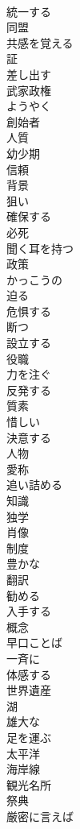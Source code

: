 \documentclass[8pt]{extreport}
\begin{document}
\begin{CJK}{UTF8}{min}
\\	統一する
\\	同盟
\\	共感を覚える
\\	証
\\	差し出す
\\	武家政権
\\	ようやく
\\	創始者
\\	人質
\\	幼少期
\\	信頼
\\	背景
\\	狙い
\\	確保する
\\	必死
\\	聞く耳を持つ
\\	政策
\\	かっこうの
\\	迫る
\\	危惧する
\\	断つ
\\	設立する
\\	役職
\\	力を注ぐ
\\	反発する
\\	質素
\\	惜しい
\\	決意する
\\	人物
\\	愛称
\\	追い詰める
\\	知識
\\	独学
\\	肖像
\\	制度
\\	豊かな
\\	翻訳
\\	勧める
\\	入手する
\\	概念
\\	早口ことば
\\	一斉に
\\	体感する
\\	世界遺産
\\	湖
\\	雄大な
\\	足を運ぶ
\\	太平洋
\\	海岸線
\\	観光名所
\\	祭典
\\	厳密に言えば

\end{CJK}
\end{document}
